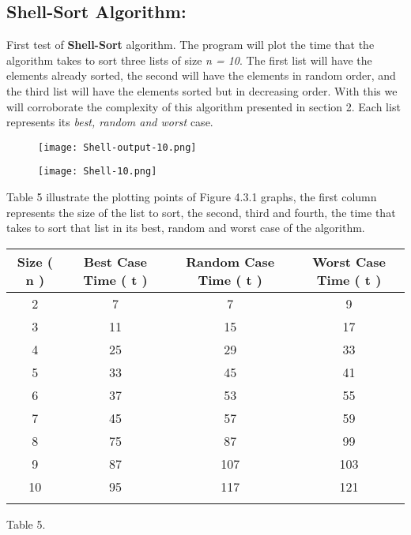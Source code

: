 \subsection{Shell-Sort Algorithm:}

First test of {\bfseries Shell-Sort} algorithm. The program will plot the time that the algorithm takes to sort three lists of size {\itshape n = 10}. The first list will have the elements already sorted, the second will have the elements in random order, and the third list will have the elements sorted but in decreasing order. With this we will corroborate the complexity of this algorithm presented in section 2. Each list represents its {\itshape best, random and worst} case. \hfill \break

\begin{figure}[H]
\texttt{[image: Shell-output-10.png]}
\centering \linebreak {}
\end{figure}

\begin{figure}[H]
\texttt{[image: Shell-10.png]}
\centering \linebreak {}
\end{figure} \pagebreak

Table 5 illustrate the plotting points of Figure 4.3.1 graphs, the first column represents the size of the list to sort, the second, third and fourth, the time that takes to sort that list in its best, random and worst case of the algorithm. \hfill \break

{\small
\begin{center} 
\begin{tabular}[.5cm]{ c c c c } 
\toprule \toprule
\hspace {5px} Size ( n ) \hspace {5px} & \hspace {15px} Best Case Time ( t ) \hspace {15px} & \hspace {15px} Random Case Time ( t ) \hspace {15px} & \hspace {15px} Worst Case Time ( t ) \hspace {15px} \\ 
\midrule \midrule
2 & 7 & 7 & 9 \\ 
\cmidrule {1-4} 
3 & 11 & 15 & 17 \\ 
\cmidrule {1-4} 
4 & 25 & 29 & 33 \\ 
\cmidrule {1-4} 
5 & 33 & 45 & 41 \\ 
\cmidrule {1-4} 
6 & 37 & 53 & 55 \\ 
\cmidrule {1-4} 
7 & 45 & 57 & 59 \\ 
\cmidrule {1-4} 
8 & 75 & 87 & 99 \\ 
\cmidrule {1-4} 
9 & 87 & 107 & 103 \\ 
\cmidrule {1-4} 
10 & 95 & 117 & 121 \\ 
\bottomrule 
\linebreak 
\end{tabular} 
\linebreak \linebreak Table 5.
\end{center}}

